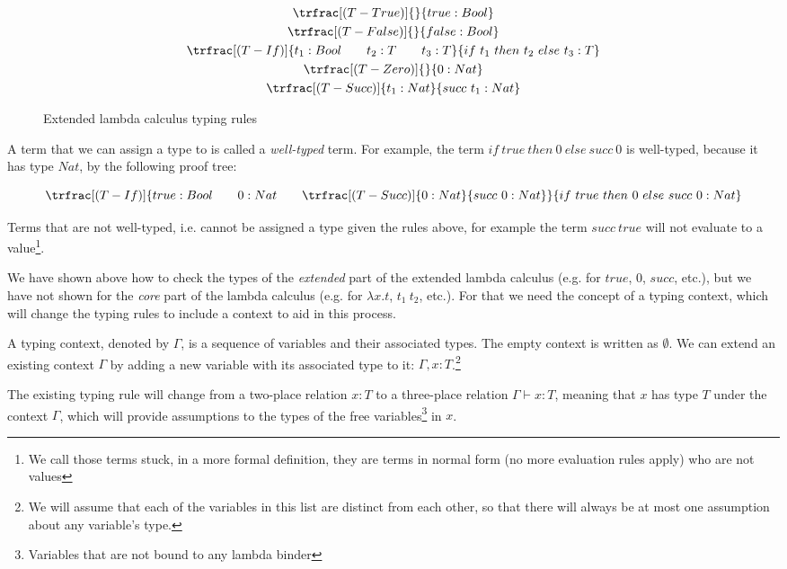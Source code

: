 \begin{figure}[H]
       \[
              \begin{gathered}
                     \trfrac[(T-True)]{}{true : Bool} \\
                     \trfrac[(T-False)]{}{false : Bool} \\
                     \trfrac[(T-If)]
                     {t_1 : Bool \qquad t_2 : T \qquad t_3 : T}
                     {if\ t_1\ then\ t_2\ else\ t_3 : T} \\
                     \trfrac[(T-Zero)]{}{0 : Nat} \\
                     \trfrac[(T-Succ)]{t_1 : Nat}{succ\ t_1 : Nat}
              \end{gathered}
       \]
       \caption{Extended lambda calculus typing rules}\label{fig:ext-lambda-calc-typing-rules}
\end{figure}

\begin{definition}
       A term that we can assign a type to is called a \emph{well-typed} term. For example, the term $if \ true\ then\ 0\ else\ succ\ 0$ is well-typed, because it has type $Nat$, by the following proof tree:

       \[
              \trfrac[(T-If)]
              {true : Bool \qquad 0 : Nat \qquad \trfrac[(T-Succ)]{0 : Nat}{succ\ 0 : Nat}}
              {if\ true\ then\ 0\ else\ succ\ 0 : Nat}
       \]
\end{definition}

Terms that are not well-typed, i.e. cannot be assigned a type given the rules above, for example the term $succ\ true$ will not evaluate to a value\footnote{We call those terms stuck, in a more formal definition, they are terms in normal form (no more evaluation rules apply) who are not values}.

We have shown above how to check the types of the \emph{extended} part of the extended lambda calculus (e.g. for $true$, $0$, $succ$, etc.), but we have not shown for the \emph{core} part of the lambda calculus (e.g. for $\lambda x.t$, $t_1\ t_2$, etc.).
For that we need the concept of a typing context, which will change the typing rules to include a context to aid in this process.

\begin{definition}[Context]
       A typing context, denoted by $\Gamma$, is a sequence of variables and their associated types.
       The empty context is written as $\emptyset$.
       We can extend an existing context $\Gamma$ by adding a new variable with its associated type to it: $\Gamma, x : T$.\footnote{We will assume that each of the variables in this list are distinct from each other, so that there will always be at most one assumption about any variable's type.}

       The existing typing rule will change from a two-place relation $x : T$ to a three-place relation $\Gamma \vdash x : T$, meaning that $x$ has type $T$ under the context $\Gamma$, which will provide assumptions to the types of the free variables\footnote{Variables that are not bound to any lambda binder} in $x$.
\end{definition}

